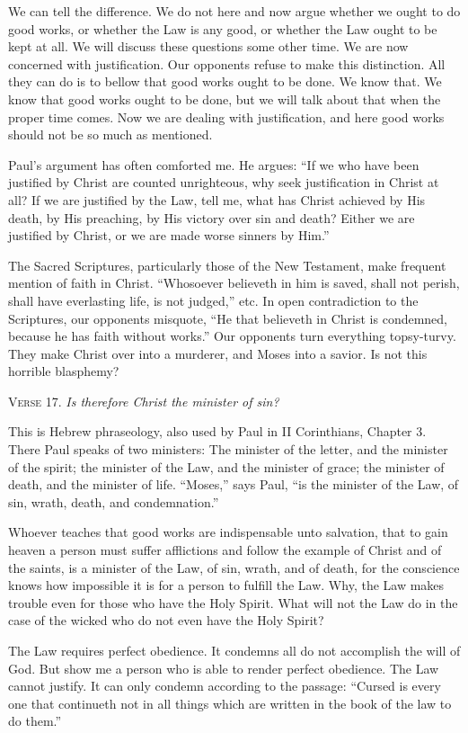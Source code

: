 We can tell the difference. We do not here and now argue whether we ought to do good works, or whether the Law is any good, or whether the Law ought to be kept at all. We will discuss these questions some other time. We are now concerned with justification. Our opponents refuse to make this distinction. All they can do is to bellow that good works ought to be done. We know that. We know that good works ought to be done, but we will talk about that when the proper time comes. Now we are dealing with justification, and here good works should not be so much as mentioned.

Paul’s argument has often comforted me. He argues: “If we who have been justified by Christ are counted unrighteous, why seek justification in Christ at all? If we are justified by the Law, tell me, what has Christ achieved by His death, by His preaching, by His victory over sin and death? Either we are justified by Christ, or we are made worse sinners by Him.”

The Sacred Scriptures, particularly those of the New Testament, make frequent mention of faith in Christ. “Whosoever believeth in him is saved, shall not perish, shall have everlasting life, is not judged,” etc. In open contradiction to the Scriptures, our opponents misquote, “He that believeth in Christ is condemned, because he has faith without works.” Our opponents turn everything topsy-turvy. They make Christ over into a murderer, and Moses into a savior. Is not this horrible blasphemy?

\textsc{Verse} 17. \emph{Is therefore Christ the minister of sin?}

This is Hebrew phraseology, also used by Paul in II Corinthians, Chapter 3. There Paul speaks of two ministers: The minister of the letter, and the minister of the spirit; the minister of the Law, and the minister of grace; the minister of death, and the minister of life. “Moses,” says Paul, “is the minister of the Law, of sin, wrath, death, and condemnation.”

Whoever teaches that good works are indispensable unto salvation, that to gain heaven a person must suffer afflictions and follow the example of Christ and of the saints, is a minister of the Law, of sin, wrath, and of death, for the conscience knows how impossible it is for a person to fulfill the Law. Why, the Law makes trouble even for those who have the Holy Spirit. What will not the Law do in the case of the wicked who do not even have the Holy Spirit?

The Law requires perfect obedience. It condemns all do not accomplish the will of God. But show me a person who is able to render perfect obedience. The Law cannot justify. It can only condemn according to the passage: “Cursed is every one that continueth not in all things which are written in the book of the law to do them.”

